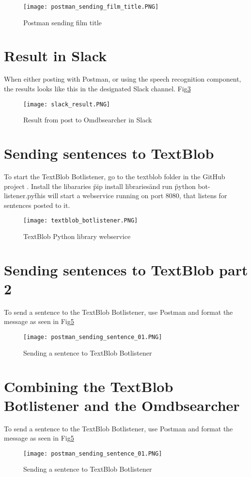 \documentclass[11pt,fleqn]{book} %
\begin{document}
\begin{figure}[]
  \centering
   \texttt{[image: postman\_sending\_film\_title.PNG]}
  \caption{Postman sending film title}
  \label{fig:postman-film}
\end{figure}

\newpage
\section{Result in Slack}
When either posting with Postman, or using the speech recognition component, the results looks like this in the designated Slack channel. Fig\ref{fig:slack-result}

\begin{figure}[]
  \centering
   \texttt{[image: slack\_result.PNG]}
  \caption{Result from post to Omdbsearcher in Slack}
  \label{fig:slack-result}
\end{figure}

\newpage
\section{Sending sentences to TextBlob}
To start the TextBlob Botlistener, go to the textblob folder in the GitHub project \cite{Github2017GitHubProject}. Install the libararies \"pip install libraries\" and run \"python bot-listener.py\" this will start a webservice running on port 8080, that listens for sentences posted to it.
\begin{figure}[]
  \centering
   \texttt{[image: textblob\_botlistener.PNG]}
  \caption{TextBlob Python library webservice}
  \label{fig:slack-result}
\end{figure}

\newpage
\section{Sending sentences to TextBlob part 2}
To send a sentence to the TextBlob Botlistener, use Postman and format the message as seen in Fig\ref{fig:sending-botlistener}
\begin{figure}[]
  \centering
   \texttt{[image: postman\_sending\_sentence\_01.PNG]}
  \caption{Sending a sentence to TextBlob Botlistener}
  \label{fig:sending-botlistener}
\end{figure}

\newpage
\section{Combining the TextBlob Botlistener and the Omdbsearcher}
To send a sentence to the TextBlob Botlistener, use Postman and format the message as seen in Fig\ref{fig:sending-botlistener}
\begin{figure}[]
  \centering
   \texttt{[image: postman\_sending\_sentence\_01.PNG]}
  \caption{Sending a sentence to TextBlob Botlistener}
  \label{fig:sending-botlistener}
\end{figure}
\end{document}
